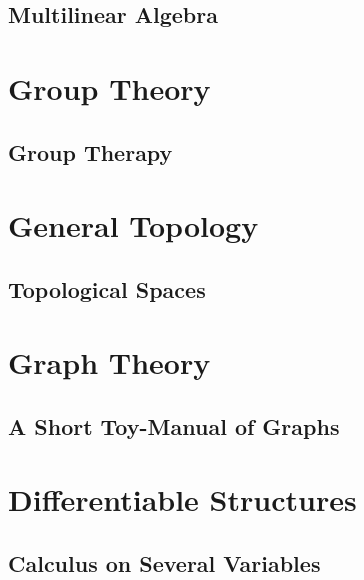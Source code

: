 \chapter{Multilinear Algebra}







\part{Group Theory}

\chapter{Group Therapy}





\part{General Topology}

\chapter{Topological Spaces}











\part{Graph Theory}

\chapter{A Short Toy-Manual of Graphs}






\part{Differentiable Structures}

\chapter{Calculus on Several Variables}






\printbibliography


